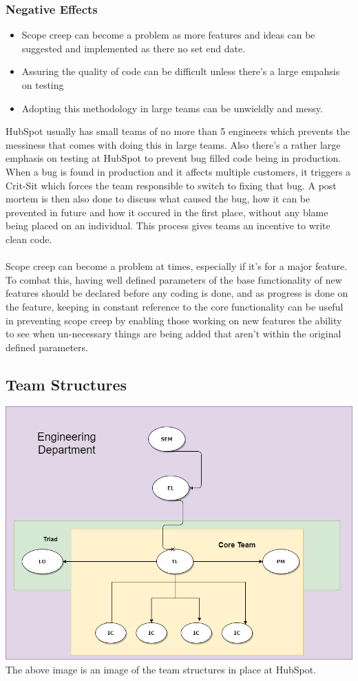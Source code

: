 \documentclass[11pt]{article} %
\begin{document}
\subsubsection{\textbf{Negative Effects}}
 \begin{itemize}
 \item Scope creep can become a problem as more features and ideas can be suggested and implemented as there no set end date.
 \item Assuring the quality of code can be difficult unless there's a large empahsis on testing
 \item Adopting this methodology in large teams can be unwieldly and messy.
\end{itemize}
HubSpot usually has small teams of no more than 5 engineers which prevents the messiness that comes with doing this in large teams. Also there's a rather large emphasis on testing at HubSpot to prevent bug filled code being in production. When a bug is found in production and it affects multiple customers, it triggers a Crit-Sit which forces the team responsible to switch to fixing that bug. A post mortem is then also done to discuss what caused the bug, how it can be prevented in future and how it occured in the first place, without any blame being placed on an individual. This process gives teams an incentive to write clean code. \\\\Scope creep can become a problem at times, especially if it's for a major feature. To combat this, having well defined parameters of the base functionality of new features should be declared before any coding is done, and as progress is done on the feature, keeping in constant reference to the core functionality can be useful in preventing scope creep by enabling those working on new features the ability to see when un-necessary things are being added that aren't within the original defined parameters.
\subsection{Team Structures}
\includegraphics[scale = 0.5]{Team Structure.png}
The above image is an image of the team structures in place at HubSpot.
\end{document}
